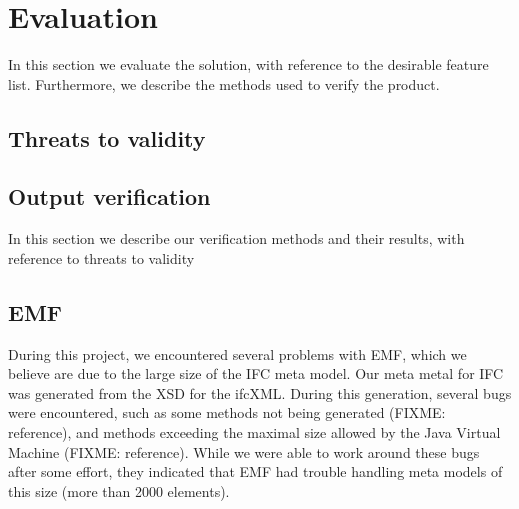 \section{Evaluation}
In this section we evaluate the solution, with reference to the desirable feature list. Furthermore, we describe the methods used to verify the product.




\subsection{Threats to validity}

\subsection{Output verification}
In this section we describe our verification methods and their results, with reference to threats to validity %

\subsection{EMF}
\label{Evaluation_EMF}
During this project, we encountered several problems with EMF, which we believe are due to the large size of the IFC meta model. Our meta metal for IFC was generated from the XSD for the ifcXML. During this generation, several bugs were encountered, such as some methods not being generated (FIXME: reference), and methods exceeding the maximal size allowed by the Java Virtual Machine (FIXME: reference). While we were able to work around these bugs after some effort, they indicated that EMF had trouble handling meta models of this size (more than 2000 elements).
